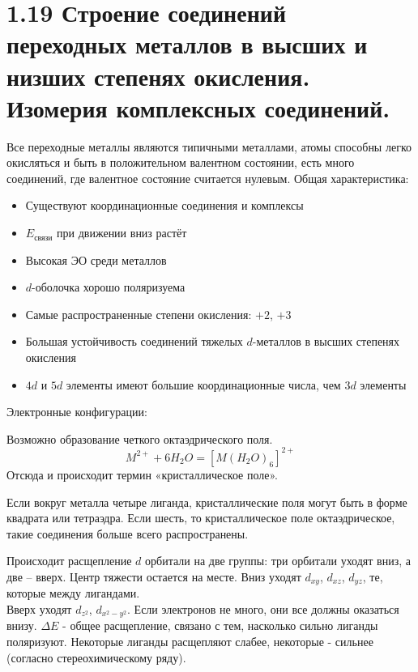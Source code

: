 \section*{1.19 Строение соединений переходных металлов в высших и низших степенях окисления. Изомерия комплексных соединений.}
Все переходные металлы являются типичными металлами, атомы способны легко окисляться и быть в положительном валентном состоянии, есть много соединений, где валентное состояние считается нулевым.
Общая характеристика:
\begin{itemize}
	\item Существуют координационные соединения и комплексы
	\item $E_{\text{связи}}$ при движении вниз растёт
	\item Высокая ЭО среди металлов
	\item $d$-оболочка хорошо поляризуема 
	\item Самые распространенные степени окисления: $+2$, $+3$
	\item Большая устойчивость соединений тяжелых $d$-металлов в высших степенях окисления
	\item $4d$ и $5d$ элементы имеют большие координационные числа, чем $3d$ элементы
\end{itemize}
\begin{figure} [H]
	\centering {\texttt{[image: qq1]}}
\end{figure}
Электронные конфигурации:
\begin{figure} [H]
	\centering {\texttt{[image: qq2]}}
\end{figure}
Возможно образование четкого октаэдрического поля.  
\[
M^{2+} + 6H_2O = \left[M(H_2O)_6\right]^{2+}
\]
Отсюда и происходит термин «кристаллическое поле». 
\begin{figure} [H]
	\centering {\texttt{[image: qq3]}}
\end{figure}
Если вокруг металла четыре лиганда, кристаллические поля могут быть в форме квадрата или тетраэдра. Если шесть, то кристаллическое поле октаэдрическое, такие соединения больше всего распространены. 
\begin{figure} [H]
	\centering {\texttt{[image: qq4]}}
\end{figure}
Происходит расщепление $d$ орбитали на две группы: три орбитали уходят вниз, а две – вверх. Центр тяжести остается на месте. Вниз уходят $d_{xy}$, $d_{xz}$, $d_{yz}$, те, которые между лигандами. \\
Вверх уходят $d_{z^2}$, $d_{x^2 -y^2}$. Если электронов не много, они все должны оказаться внизу. $\Delta E$ - общее расщепление, связано с тем, насколько сильно лиганды поляризуют. Некоторые лиганды расщепляют слабее, некоторые - сильнее (согласно стереохимическому ряду).
